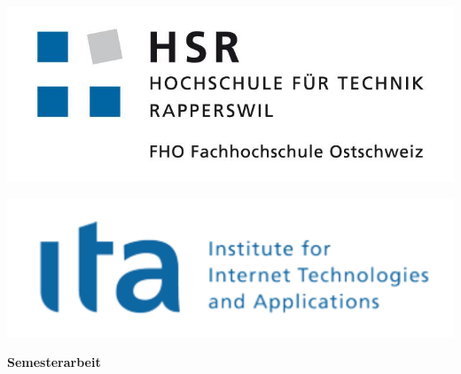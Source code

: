 

\begin{titlepage}
\begin{center}
\begin{minipage}[t]{0.45\textwidth}
    \includegraphics[width=\textwidth]{start/img/hsrLogo}
\end{minipage}
\hspace{\fill} %
\begin{minipage}[t]{0.45\textwidth}
    \vspace{-2.9cm}
    \includegraphics[width=\textwidth]{start/img/itaLogo} %
\end{minipage}

\end{center}

\vspace{15ex} %
\begin{center}
	\Huge 
	\begin{framed}
		\textbf{\titel}
	\end{framed}
	
	\vspace{3ex}
	\textbf{Semesterarbeit}
	
	\vspace{1ex}
	\LARGE 
	\place
	

\end{center}
\end{titlepage}
